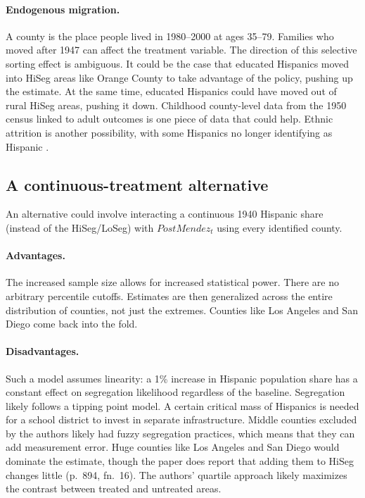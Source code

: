 \documentclass[11pt]{article}
\begin{document}
\paragraph{Endogenous migration.} A county is the place people lived in 1980--2000 at ages 35--79. Families who moved after 1947 can affect the treatment variable. The direction of this selective sorting effect is ambiguous. It could be the case that educated Hispanics moved into HiSeg areas like Orange County to take advantage of the policy, pushing up the estimate. At the same time, educated Hispanics could have moved out of rural HiSeg areas, pushing it down. Childhood county-level data from the 1950 census linked to adult outcomes is one piece of data that could help. Ethnic attrition is another possibility, with some Hispanics no longer identifying as Hispanic \citep{duncantrejo2011}.

\subsection{A continuous-treatment alternative}
\label{sec:continuous}

An alternative could involve interacting a continuous 1940 Hispanic share (instead of the HiSeg\slash LoSeg) with $PostMendez_t$ using every identified county. 

\paragraph{Advantages.} The increased sample size allows for increased statistical power. There are no arbitrary percentile cutoffs. Estimates are then generalized across the entire distribution of counties, not just the extremes. Counties like Los Angeles and San Diego come back into the fold.

\paragraph{Disadvantages.} Such a model assumes linearity: a 1\% increase in Hispanic population share has a constant effect on segregation likelihood regardless of the baseline. Segregation likely follows a tipping point model. A certain critical mass of Hispanics is needed for a school district to invest in separate infrastructure. Middle counties excluded by the authors likely had fuzzy segregation practices, which means that they can add measurement error. Huge counties like Los Angeles and San Diego would dominate the estimate, though the paper does report that adding them to HiSeg changes little (p.~894, fn.~16). The authors' quartile approach likely maximizes the contrast between treated and untreated areas.
\end{document}
